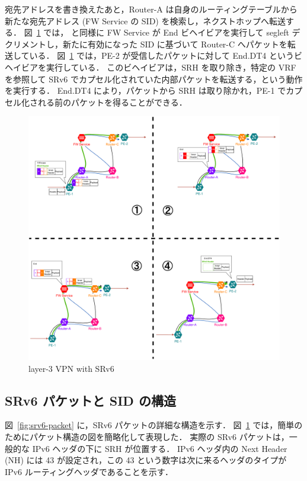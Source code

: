 宛先アドレスを書き換えたあと，Router-A は自身のルーティングテーブルから新たな宛先アドレス (FW Service の SID) を検索し，ネクストホップへ転送する．
図~\ref*{fig:srv6-vpn}  では， と同様に FW Service が End ビヘイビアを実行して segleft デクリメントし，新たに有効になった SID に基づいて Router-C へパケットを転送している．
図~\ref*{fig:srv6-vpn}  では，PE-2 が受信したパケットに対して End.DT4 というビヘイビアを実行している．
このビヘイビアは，SRH を取り除き，特定の VRF を参照して SRv6 でカプセル化されていた内部パケットを転送する，という動作を実行する．
End.DT4 により，パケットから SRH は取り除かれ，PE-1 でカプセル化される前のパケットを得ることができる．

\begin{figure}[t]
    \centering
    \includegraphics[width=0.95\linewidth]{img/ExplainEndDT4.pdf}
    \caption{layer-3 VPN with SRv6}
    \label{fig:srv6-vpn}
\end{figure}

\subsection*{SRv6 パケットと SID の構造}
\label{sbsection:srv6-sid-struct}
図~\ref*{fig:srv6-packet} に，SRv6 パケットの詳細な構造を示す．
図~\ref*{fig:srv6-vpn} では，簡単のためにパケット構造の図を簡略化して表現した．
実際の SRv6 パケットは，一般的な IPv6 ヘッダの下に SRH が位置する．
IPv6 ヘッダ内の Next Header (NH) には 43 が設定され，この 43 という数字は次に来るヘッダのタイプが IPv6 ルーティングヘッダであることを示す．


